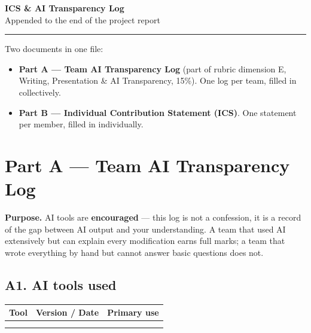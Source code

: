 \documentclass[11pt]{article}
\begin{document}
\begin{center}
  {\LARGE\bfseries ICS \& AI Transparency Log}\\[0.4em]
  {\large Appended to the end of the project report}
\end{center}
\vspace{0.2em}
\hrule
\vspace{0.6em}

Two documents in one file:
\begin{itemize}[leftmargin=2em, itemsep=1pt]
  \item \textbf{Part A --- Team AI Transparency Log} (part of rubric dimension E,
    Writing, Presentation \& AI Transparency, 15\%). One log per team, filled in
    collectively.
  \item \textbf{Part B --- Individual Contribution Statement (ICS)}. One statement per
    member, filled in individually.
\end{itemize}

\section*{Part A --- Team AI Transparency Log}
\textbf{Purpose.} AI tools are \textbf{encouraged} --- this log is not a
confession, it is a record of the gap between AI output and your understanding.
A team that used AI extensively but can explain every modification earns full
marks; a team that wrote everything by hand but cannot answer basic questions
does not.

\subsection*{A1. AI tools used}
\begin{table}[h]
\centering
\small
\begin{tabular}{@{}p{3.5cm}p{4.5cm}p{3.5cm}@{}}
\toprule
Tool & Version / Date & Primary use \\
\midrule
 & & \\
 & & \\
\bottomrule
\end{tabular}
\end{table}
\end{document}
